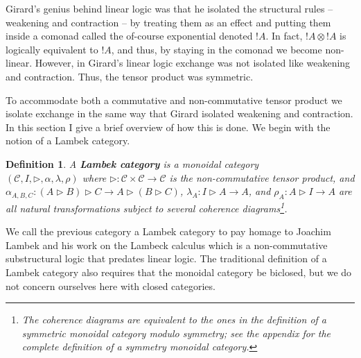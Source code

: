 \documentclass{sigplanconf}
\let\mto\to
\let\to\relax
\newcommand{\to}{\rightarrow}
\newcommand{\cat}[1]{\mathcal{#1}}
\newtheorem{definition}[theorem]{Definition}
\begin{document}
Girard's genius behind linear logic was that he isolated the
structural rules -- weakening and contraction -- by treating them as
an effect and putting them inside a comonad called the of-course
exponential denoted $!A$.  In fact, $!A \otimes !A$ is logically
equivalent to $!A$, and thus, by staying in the comonad we become
non-linear.  However, in Girard's linear logic exchange was not
isolated like weakening and contraction.  Thus, the tensor product was
symmetric.

To accommodate both a commutative and non-commutative tensor product
we isolate exchange in the same way that Girard isolated weakening and
contraction.  In this section I give a brief overview of how this is
done.  We begin with the notion of a Lambek category.
\begin{definition}
  \label{def:Lambek-category}
  A \textbf{Lambek category} is a monoidal category \\ $(\cat{C}, I,
  \rhd, \alpha, \lambda, \rho)$ where $\rhd : \cat{C} \times \cat{C}
  \mto \cat{C}$ is the non-commutative tensor product, and
  $\alpha_{A,B,C} : (A \rhd B) \rhd C \mto A \rhd (B \rhd C)$,
  $\lambda_A : I \rhd A \mto A$, and $\rho_A : A \rhd I \mto A$ are
  all natural transformations subject to several coherence
  diagrams\footnote{The coherence diagrams are equivalent to the ones
    in the definition of a symmetric monoidal category modulo
    symmetry; see the appendix for the complete definition of a
    symmetry monoidal category.}.
\end{definition}
\noindent
We call the previous category a Lambek category to pay homage to
Joachim Lambek and his work on the Lambeck calculus \cite{Lambek}
which is a non-commutative substructural logic that predates linear
logic.  The traditional definition of a Lambek category also requires
that the monoidal category be biclosed, but we do not concern
ourselves here with closed categories.
\end{document}
